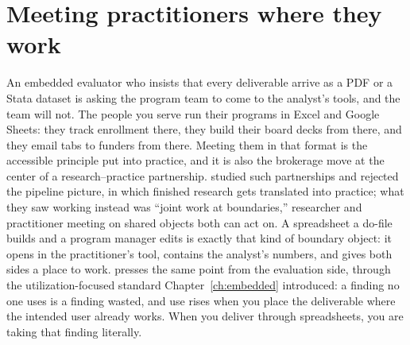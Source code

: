 \documentclass[
    a4paper,
    fontsize=10pt,
    twoside=true,
    numbers=noenddot,
]{kaobook}
\begin{document}
\section{Meeting practitioners where they work}\label{sec:ch11-rationale}
An embedded evaluator who insists that every deliverable arrive as a PDF or a Stata dataset is asking the program team to come to the analyst's tools, and the team will not. The people you serve run their programs in Excel and Google Sheets: they track enrollment there, they build their board decks from there, and they email tabs to funders from there. Meeting them in that format is the accessible principle put into practice, and it is also the brokerage move at the center of a research--practice partnership. \textcite{penuel2015partnerships} studied such partnerships and rejected the pipeline picture, in which finished research gets translated into practice; what they saw working instead was \enquote{joint work at boundaries,} researcher and practitioner meeting on shared objects both can act on. A spreadsheet a do-file builds and a program manager edits is exactly that kind of boundary object: it opens in the practitioner's tool, contains the analyst's numbers, and gives both sides a place to work. \textcite{patton2008utilization} presses the same point from the evaluation side, through the utilization-focused standard Chapter~\ref{ch:embedded} introduced: a finding no one uses is a finding wasted, and use rises when you place the deliverable where the intended user already works. When you deliver through spreadsheets, you are taking that finding literally.
\end{document}
